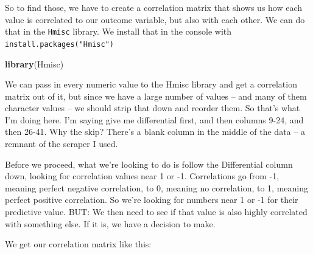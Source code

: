 \documentclass[]{book}
\newenvironment{Shaded}{\begin{snugshade}}{\end{snugshade}}
\newcommand{\KeywordTok}[1]{\textcolor[rgb]{0.13,0.29,0.53}{\textbf{#1}}}
\newcommand{\DecValTok}[1]{\textcolor[rgb]{0.00,0.00,0.81}{#1}}
\newcommand{\StringTok}[1]{\textcolor[rgb]{0.31,0.60,0.02}{#1}}
\newcommand{\OperatorTok}[1]{\textcolor[rgb]{0.81,0.36,0.00}{\textbf{#1}}}
\newcommand{\NormalTok}[1]{#1}
\begin{document}
So to find those, we have to create a correlation matrix that shows us
how each value is correlated to our outcome variable, but also with each
other. We can do that in the \texttt{Hmisc} library. We install that in
the console with \texttt{install.packages("Hmisc")}

\begin{Shaded}
\begin{Highlighting}[]
\KeywordTok{library}\NormalTok{(Hmisc)}
\end{Highlighting}
\end{Shaded}

We can pass in every numeric value to the Hmisc library and get a
correlation matrix out of it, but since we have a large number of values
-- and many of them character values -- we should strip that down and
reorder them. So that's what I'm doing here. I'm saying give me
differential first, and then columns 9-24, and then 26-41. Why the skip?
There's a blank column in the middle of the data -- a remnant of the
scraper I used.

\begin{Shaded}
\end{Shaded}

Before we proceed, what we're looking to do is follow the Differential
column down, looking for correlation values near 1 or -1. Correlations
go from -1, meaning perfect negative correlation, to 0, meaning no
correlation, to 1, meaning perfect positive correlation. So we're
looking for numbers near 1 or -1 for their predictive value. BUT: We
then need to see if that value is also highly correlated with something
else. If it is, we have a decision to make.

We get our correlation matrix like this:

\begin{Shaded}
\end{Shaded}
\end{document}
